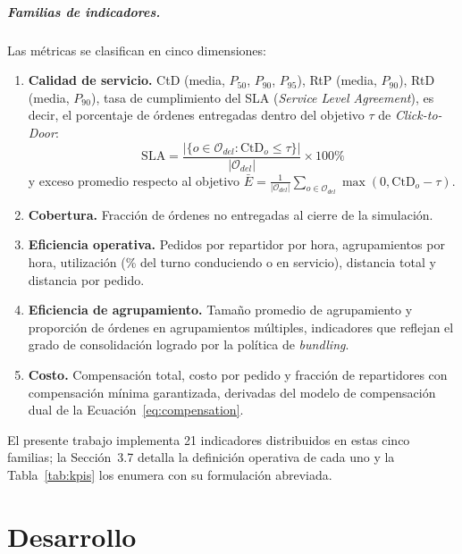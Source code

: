 \documentclass[12pt,letterpaper,oneside]{book}
\begin{document}
	\paragraph{Familias de indicadores.}
	Las métricas se clasifican en cinco dimensiones:

	\begin{enumerate}
		\item \textbf{Calidad de servicio.}  CtD (media, $P_{50}$, $P_{90}$,
		      $P_{95}$), RtP (media, $P_{90}$), RtD (media, $P_{90}$), tasa de
		      cumplimiento del SLA (\textit{Service Level Agreement}), es decir,
		      el porcentaje de órdenes entregadas dentro del objetivo $\tau$ de
		      \textit{Click-to-Door}:
		      \begin{equation}
				\text{SLA} = \frac{|\{o \in \mathcal{O}_{del} : \text{CtD}_o \leq \tau\}|}{|\mathcal{O}_{del}|}
				\times 100\%
				\label{eq:sla}
		      \end{equation}
		      y exceso promedio respecto al objetivo
		      $\bar{E} = \frac{1}{|\mathcal{O}_{del}|}\sum_{o \in \mathcal{O}_{del}} \max(0, \text{CtD}_o - \tau)$.

		\item \textbf{Cobertura.}  Fracción de órdenes no entregadas al cierre
		      de la simulación.

		\item \textbf{Eficiencia operativa.}  Pedidos por repartidor por hora,
		      agrupamientos por hora, utilización (\% del turno conduciendo o en servicio),
		      distancia total y distancia por pedido.

		\item \textbf{Eficiencia de agrupamiento.}  Tamaño promedio de
		      agrupamiento y proporción de órdenes en agrupamientos múltiples,
		      indicadores que reflejan el grado de consolidación logrado por la
		      política de \textit{bundling}.

		\item \textbf{Costo.}  Compensación total, costo por pedido y fracción
		      de repartidores con compensación mínima garantizada, derivadas del
		      modelo de compensación dual de la Ecuación~\ref{eq:compensation}.
	\end{enumerate}

	El presente trabajo implementa 21 indicadores distribuidos en estas
	cinco familias; la Sección~3.7 detalla la definición operativa de cada
	uno y la Tabla~\ref{tab:kpis} los enumera con su formulación abreviada.


	\chapter{Desarrollo}
\end{document}
